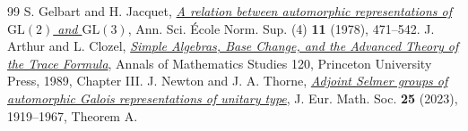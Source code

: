 \documentclass[a4paper,11pt]{article}
\theoremstyle{definition}
\theoremstyle{remark}
\numberwithin{equation}{section}
\begin{document}
\begin{thebibliography}{99}
 S. Gelbart and H. Jacquet, \href{https://www.numdam.org/item/ASENS_1978_4_11_4_471_0/}{\emph{A relation between automorphic representations of \(\mathrm{GL}(2)\) and \(\mathrm{GL}(3)\)}}, Ann. Sci. \'Ecole Norm. Sup. (4) \textbf{11} (1978), 471--542.
 J. Arthur and L. Clozel, \href{https://www.claymath.org/library/cw/arthur/pdf/30.pdf}{\emph{Simple Algebras, Base Change, and the Advanced Theory of the Trace Formula}}, Annals of Mathematics Studies 120, Princeton University Press, 1989, Chapter III.
 J. Newton and J. A. Thorne, \href{https://arxiv.org/pdf/1912.11265}{\emph{Adjoint Selmer groups of automorphic Galois representations of unitary type}}, J. Eur. Math. Soc. \textbf{25} (2023), 1919--1967, Theorem A.
\end{thebibliography}\endgroup
\end{document}
